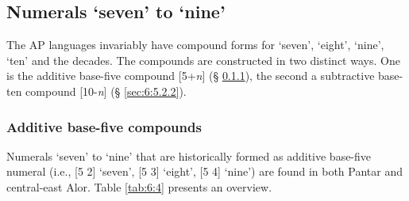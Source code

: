 \subsection{Numerals `seven' to `nine'}\label{sec:6:5.2}
The AP languages invariably have compound forms for `seven', `eight', `nine', `ten' and the decades. The compounds are constructed in two distinct ways. One is the additive base-five compound [5+\textit{n}] ({\S} \ref{sec:6:5.2.1}), the second a subtractive base-ten compound [10-\textit{n}] ({\S} \ref{sec:6:5.2.2}). 

\subsubsection{Additive base-five compounds} \label{sec:6:5.2.1}
Numerals `seven' to `nine' that are historically formed as additive base-five numeral (i.e., [5 2] `seven', [5 3] `eight', [5 4] `nine') are found in both Pantar and central-east Alor. Table \ref{tab:6:4} presents an overview.

 

